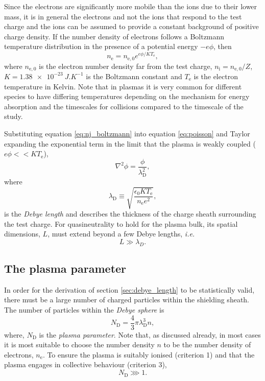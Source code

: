 Since the electrons are significantly more mobile than the ions due to their lower mass, it is in general the electrons and not the ions that respond to the test charge and the ions can be assumed to provide a constant background of positive charge density.
If the number density of electrons follows a Boltzmann temperature distribution in the presence of a potential energy $-e\phi$, then
\begin{equation}\label{eq:nj_boltzmann}
	n_\mathrm{e}= n_{\mathrm{e},0}e^{e\phi/KT_\mathrm{e}},
\end{equation}
where $n_{\mathrm{e},0}$ is the electron number density far from the test charge, $n_\mathrm{i} = n_{\mathrm{e},0}/Z$, $K = \qty{1.38e-23}{J.K^{-1}}$ is the Boltzmann constant and $T_\mathrm{e}$ is the electron temperature in Kelvin. Note that in plasmas it is very common for different species to have differing temperatures depending on the mechanism for energy absorption and the timescales for collisions compared to the timescale of the study.

Substituting equation \ref{eq:nj_boltzmann} into equation \ref{eq:poisson} and Taylor expanding the exponential term in the limit that the plasma is weakly coupled ($e\phi << KT_\mathrm{e}$), 
\begin{equation}\label{eq:poisson_debye2}
	\nabla^2\phi = \frac{\phi}{\lambda_\mathrm{D}^2},
\end{equation}
where
\begin{equation}\label{eq:debye}
	\lambda_\mathrm{D} \equiv \sqrt{\frac{\epsilon_0KT_\mathrm{e}}{n_\mathrm{e}e^2}},
\end{equation}
is the \textit{Debye length} and describes the thickness of the charge sheath surrounding the test charge. For quasineutrality to hold for the plasma bulk, its spatial dimensions, $L$, must extend beyond a few Debye lengths, \textit{i.e.}
\begin{equation}
	L \gg \lambda_D.
\end{equation}

\subsection{\label{sec:plasma_parameter}The plasma parameter}
In order for the derivation of section \ref{sec:debye_length} to be statistically valid, there must be a large number of charged particles within the shielding sheath. The number of particles within the \textit{Debye sphere} is
\begin{equation}\label{eq:plasma_parameter}
	N_\mathrm{D} = \frac{4}{3}\pi\lambda_\mathrm{D}^3n,
\end{equation}
where, $N_\mathrm{D}$ is the \textit{plasma parameter}. Note that, as discussed already, in most cases it is most suitable to choose the number density $n$ to be the number density of electrons, $n_\mathrm{e}$. To ensure the plasma is suitably ionised (criterion 1) and that the plasma engages in collective behaviour (criterion 3),
\begin{equation}\label{eq:plasma_parameter_condition}
	N_\mathrm{D} \ggg 1.
\end{equation}

